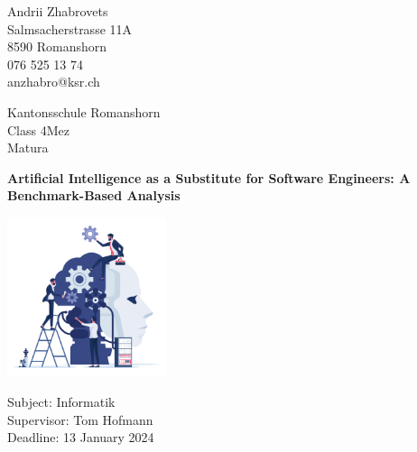 \begin{titlepage}
    \clearpage\thispagestyle{empty}

    \begin{minipage}[t]{\textwidth}
        \begin{minipage}[t]{0.5\textwidth}
            Andrii Zhabrovets\\
            Salmsacherstrasse 11A\\
            8590 Romanshorn\\
            076 525 13 74\\
            anzhabro@ksr.ch
        \end{minipage}
        \begin{minipage}[t]{0.5\textwidth}
            \begin{flushright}
                Kantonsschule Romanshorn\\
                Class 4Mez\\
                Matura 
            \end{flushright}
        \end{minipage}
    \end{minipage}

    \vspace{4cm}


    {
    \centering

    \Huge\bfseries Artificial Intelligence as a Substitute for Software Engineers: A Benchmark-Based Analysis\par

    \vspace{1cm}

    \includegraphics[width=0.35\textwidth]{attachments/ai-title.png}\par
    }

    \vspace{46mm}

    \noindent
    Subject: Informatik\noindent \\ 
    Supervisor: Tom Hofmann  \\
    Deadline: 13 January 2024 \\

\end{titlepage}